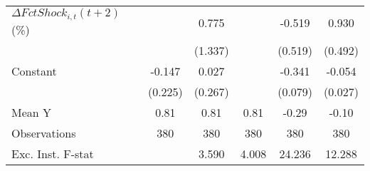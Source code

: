 {\begin{tabular}{l*{5}{c}}
\addlinespace
$ \Delta FctShock_{i,t}(t+2)$ (\%)&                     &       0.775         &                     &      -0.519         &       0.930\sym{*}  \\
                    &                     &     (1.337)         &                     &     (0.519)         &     (0.492)         \\
\addlinespace
Constant            &      -0.147         &       0.027         &                     &      -0.341\sym{***}&      -0.054\sym{*}  \\
                    &     (0.225)         &     (0.267)         &                     &     (0.079)         &     (0.027)         \\
\midrule
Mean Y              &        0.81         &        0.81         &        0.81         &       -0.29         &       -0.10         \\
Observations        &         380         &         380         &         380         &         380         &         380         \\
Exc. Inst. F-stat   &                     &       3.590         &       4.008         &      24.236         &      12.288         \\
\bottomrule
\end{tabular}
}
